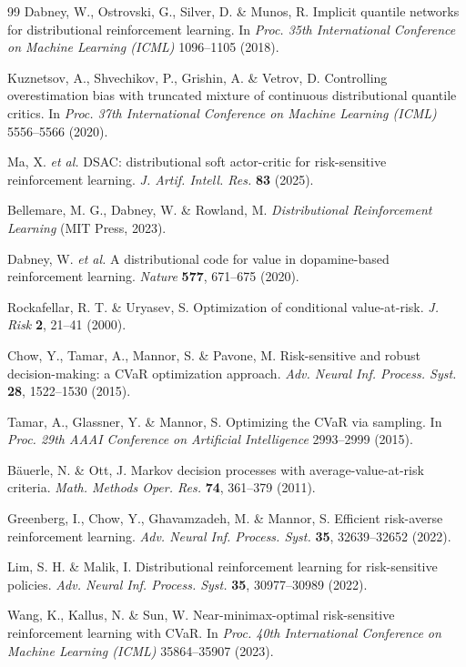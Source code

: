 \begin{thebibliography}{99}
 Dabney, W., Ostrovski, G., Silver, D. \& Munos, R. Implicit quantile networks for distributional reinforcement learning. In \textit{Proc. 35th International Conference on Machine Learning (ICML)} 1096--1105 (2018).

 Kuznetsov, A., Shvechikov, P., Grishin, A. \& Vetrov, D. Controlling overestimation bias with truncated mixture of continuous distributional quantile critics. In \textit{Proc. 37th International Conference on Machine Learning (ICML)} 5556--5566 (2020).

 Ma, X. \textit{et al.} DSAC: distributional soft actor-critic for risk-sensitive reinforcement learning. \textit{J. Artif. Intell. Res.} \textbf{83} (2025).

 Bellemare, M. G., Dabney, W. \& Rowland, M. \textit{Distributional Reinforcement Learning} (MIT Press, 2023).

 Dabney, W. \textit{et al.} A distributional code for value in dopamine-based reinforcement learning. \textit{Nature} \textbf{577}, 671--675 (2020).

 Rockafellar, R. T. \& Uryasev, S. Optimization of conditional value-at-risk. \textit{J. Risk} \textbf{2}, 21--41 (2000).

 Chow, Y., Tamar, A., Mannor, S. \& Pavone, M. Risk-sensitive and robust decision-making: a CVaR optimization approach. \textit{Adv. Neural Inf. Process. Syst.} \textbf{28}, 1522--1530 (2015).

 Tamar, A., Glassner, Y. \& Mannor, S. Optimizing the CVaR via sampling. In \textit{Proc. 29th AAAI Conference on Artificial Intelligence} 2993--2999 (2015).

 B\"auerle, N. \& Ott, J. Markov decision processes with average-value-at-risk criteria. \textit{Math. Methods Oper. Res.} \textbf{74}, 361--379 (2011).

 Greenberg, I., Chow, Y., Ghavamzadeh, M. \& Mannor, S. Efficient risk-averse reinforcement learning. \textit{Adv. Neural Inf. Process. Syst.} \textbf{35}, 32639--32652 (2022).

 Lim, S. H. \& Malik, I. Distributional reinforcement learning for risk-sensitive policies. \textit{Adv. Neural Inf. Process. Syst.} \textbf{35}, 30977--30989 (2022).

 Wang, K., Kallus, N. \& Sun, W. Near-minimax-optimal risk-sensitive reinforcement learning with CVaR. In \textit{Proc. 40th International Conference on Machine Learning (ICML)} 35864--35907 (2023).


\end{thebibliography}

